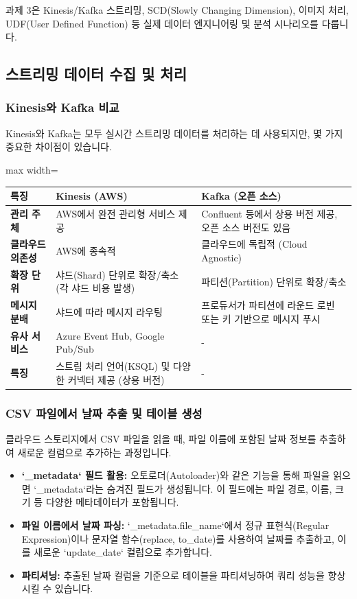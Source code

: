 \documentclass[11pt,a4paper]{article}
\begin{document}
과제 3은 Kinesis/Kafka 스트리밍, SCD(Slowly Changing Dimension), 이미지 처리, UDF(User Defined Function) 등 실제 데이터 엔지니어링 및 분석 시나리오를 다룹니다.

\subsection{스트리밍 데이터 수집 및 처리}

\subsubsection{Kinesis와 Kafka 비교}
Kinesis와 Kafka는 모두 실시간 스트리밍 데이터를 처리하는 데 사용되지만, 몇 가지 중요한 차이점이 있습니다.

\begin{adjustbox}{max width=\textwidth}
\begin{tabular}{lll}
\toprule
\textbf{특징} & \textbf{Kinesis (AWS)} & \textbf{Kafka (오픈 소스)} \\
\midrule
\textbf{관리 주체} & AWS에서 완전 관리형 서비스 제공 & Confluent 등에서 상용 버전 제공, 오픈 소스 버전도 있음 \\
\textbf{클라우드 의존성} & AWS에 종속적 & 클라우드에 독립적 (Cloud Agnostic) \\
\textbf{확장 단위} & 샤드(Shard) 단위로 확장/축소 (각 샤드 비용 발생) & 파티션(Partition) 단위로 확장/축소 \\
\textbf{메시지 분배} & 샤드에 따라 메시지 라우팅 & 프로듀서가 파티션에 라운드 로빈 또는 키 기반으로 메시지 푸시 \\
\textbf{유사 서비스} & Azure Event Hub, Google Pub/Sub & - \\
\textbf{특징} & 스트림 처리 언어(KSQL) 및 다양한 커넥터 제공 (상용 버전) & - \\
\bottomrule
\end{tabular}
\end{adjustbox}

\subsubsection{CSV 파일에서 날짜 추출 및 테이블 생성}
클라우드 스토리지에서 CSV 파일을 읽을 때, 파일 이름에 포함된 날짜 정보를 추출하여 새로운 컬럼으로 추가하는 과정입니다.

\begin{itemize}
    \item \textbf{`_metadata` 필드 활용:} 오토로더(Autoloader)와 같은 기능을 통해 파일을 읽으면 `_metadata`라는 숨겨진 필드가 생성됩니다. 이 필드에는 파일 경로, 이름, 크기 등 다양한 메타데이터가 포함됩니다.
    \item \textbf{파일 이름에서 날짜 파싱:} `_metadata.file_name`에서 정규 표현식(Regular Expression)이나 문자열 함수(replace, to_date)를 사용하여 날짜를 추출하고, 이를 새로운 `update_date` 컬럼으로 추가합니다.
    \item \textbf{파티셔닝:} 추출된 날짜 컬럼을 기준으로 테이블을 파티셔닝하여 쿼리 성능을 향상시킬 수 있습니다.
\end{itemize}
\end{document}
